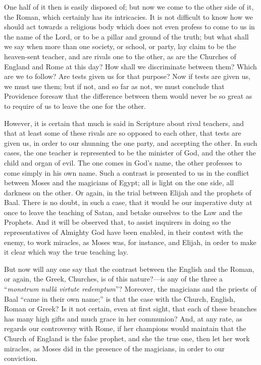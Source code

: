 One half of it then is easily disposed of; but now we come to the
other side of it, the Roman, which certainly has its intricacies. It
is not difficult to know how we should act towards a religious body
which does not even profess to come to us in the name of the Lord, or
to be a pillar and ground of the truth; but what shall we say when
more than one society, or school, or party, lay claim to be the
heaven-sent teacher, and are rivals one to the other, as are the
Churches of England and Rome at this day? How shall we discriminate
between them? Which are we to follow? Are tests given us for that
purpose? Now if tests are given us, we must use them; but if not, and
so far as not, we must conclude that Providence foresaw that the
difference between them would never be so great as to require of us to
leave the one for the other.

However, it is certain that much is said in Scripture about rival
teachers, and that at least some of these rivals are so opposed to
each other, that tests are given us, in order to our shunning the one
party, and accepting the other. In such cases, the one teacher is
represented to be the minister of God, and the other the child and
organ of evil. The one comes in God's name, the other professes to
come simply in his own name. Such a contrast is presented to us in the
conflict between Moses and the magicians of Egypt; all is light on the
one side, all darkness on the other. Or again, in the trial between
Elijah and the prophets of Baal. There is no doubt, in such a case,
that it would be our imperative duty at once to leave the teaching of
Satan, and betake ourselves to the Law and the Prophets. And it will
be observed that, to assist inquirers in doing so the representatives
of Almighty God have been enabled, in their contest with the enemy, to
work miracles, as Moses was, for instance, and Elijah, in order to
make it clear which way the true teaching lay.

But now will any one say that the contrast between the English and
the Roman, or again, the Greek, Churches, is of this nature?—is any
of the three a ``\emph{monstrum nullâ virtute redemptum}''?
Moreover, the magicians and the priests of Baal ``came in their
own name;'' is that the case with the Church, English, Roman
or Greek? Is it not certain, even at first sight, that each of these
branches has many high gifts and much grace in her communion? And, at
any rate, as regards our controversy with Rome, if her champions would
maintain that the Church of England is the false prophet, and she the
true one, then let her work miracles, as Moses did in the presence of
the magicians, in order to our conviction.

